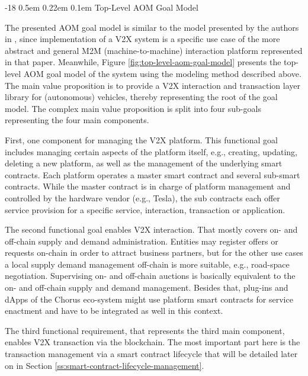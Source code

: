 \documentclass{llncs}
\makeatletter
\renewcommand\subsubsection{\@startsection{subsubsection}{3}{\z@}%
		{-18\p@ \@plus -4\p@ \@minus -4\p@}%
		{0.5em \@plus 0.22em \@minus 0.1em}%
		{\normalfont\normalsize\bfseries\boldmath}}
\makeatother
\begin{document}
{			\subsubsection{Top-Level AOM Goal Model}
				\label{sss:top-level-goal-model}
				
				The presented AOM goal model is similar to the model presented by the authors in \cite{leidingM2M}, since implementation of a V2X system is a specific use case of the more abstract and general M2M (machine-to-machine) interaction platform represented in that paper. Meanwhile, Figure \ref{fig:top-level-aom-goal-model} presents the top-level AOM goal model of the system using the modeling method described above. The main value proposition is to provide a V2X interaction and transaction layer library for (autonomous) vehicles, thereby representing the root of the goal model. The complex main value proposition is split into four sub-goals representing the four main components.
				
				First, one component for managing the V2X platform. This functional goal includes managing certain aspects of the platform itself, e.g., creating, updating, deleting a new platform, as well as the management of the underlying smart contracts. Each platform operates a master smart contract and several sub-smart contracts. While the master contract is in charge of platform management and controlled by the hardware vendor (e.g., Tesla), the sub contracts each offer service provision for a specific service, interaction, transaction or application.
				
				The second functional goal enables V2X interaction. That mostly covers on- and off-chain supply and demand administration. Entities may register offers or requests on-chain in order to attract business partners, but for the other use cases a local supply demand management off-chain is more suitable, e.g., road-space negotiation. Supervising on- and off-chain auctions is basically equivalent to the on- and off-chain supply and demand management. Besides that, plug-ins and dApps of the Chorus eco-system might use platform smart contracts for service enactment and have to be integrated as well in this context.
				
				The third functional requirement, that represents the third main component, enables V2X transaction via the blockchain. The most important part here is the transaction management via a smart contract lifecycle that will be detailed later on in Section \ref{ss:smart-contract-lifecycle-management}.
				
}
\end{document}
